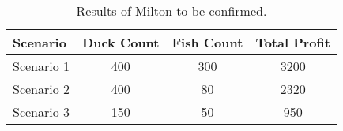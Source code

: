 \documentclass[sigconf, nonacm]{acmart}
\begin{document}
\begin{table}[htbp]
	\centering
	\begin{tabular}{lccc}
		\toprule
		\textbf{Scenario} & \textbf{Duck Count} & \textbf{Fish Count} & \textbf{Total Profit} \\
		\midrule
		Scenario 1 & 400 & 300 & 3200 \\
		Scenario 2 & 400 & 80 & 2320 \\
		Scenario 3 & 150 & 50 & 950 \\
		\bottomrule
	\end{tabular}
	\caption{Results of Milton \cite{Milton2009} to be confirmed.}
	\label{tab:replication_results_confirmation}
\end{table}





\end{document}
